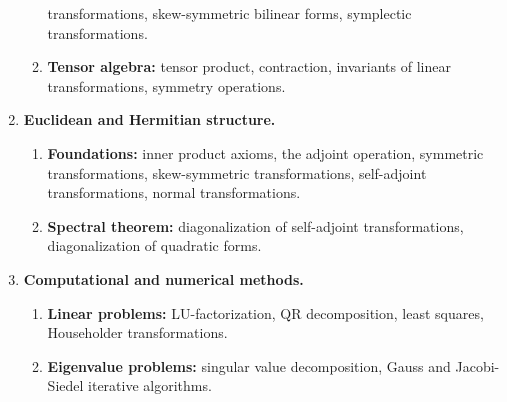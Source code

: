 \documentclass[12pt]{article}
\begin{document}
\begin{enumerate}
\begin{enumerate}
    transformations, skew-symmetric bilinear forms, symplectic
    transformations.
  \item {\bf Tensor algebra:} tensor product, contraction, invariants
    of linear transformations, symmetry operations.
  \end{enumerate}
\item {\bf Euclidean and Hermitian structure.}
  \begin{enumerate}
  \item{\bf Foundations:} inner product axioms, the adjoint operation,
    symmetric transformations, skew-symmetric transformations,
    self-adjoint transformations, normal transformations.
  \item{\bf Spectral theorem:} diagonalization of self-adjoint
    transformations, diagonalization of quadratic forms.
  \end{enumerate}
\item {\bf Computational and numerical methods.}
  \begin{enumerate}
  \item {\bf Linear problems:}  LU-factorization, QR decomposition, least
    squares, Householder transformations.
  \item {\bf Eigenvalue problems:} singular value decomposition, Gauss and
    Jacobi-Siedel iterative algorithms.
  \end{enumerate}
\end{enumerate}
\end{document}
